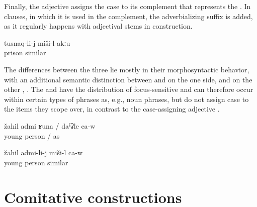 Finally, the adjective   assigns the  case to its complement that represents the  . In  clauses, in which it is used in the  complement, the adverbializing suffix  is added, as it regularly happens with adjectival stems in  construction.
%
\begin{exe}
	\ex	\label{ex:This is not similar to a prison}
	\gll	tusnaq-li-j	miši-l	akːu\\
		prison	similar	\\
	\glt	{}
\end{exe}

The differences between the three  lie mostly in their morphosyntactic behavior, with an additional semantic distinction between  and  on the one side, and  on the other , . The   and  have the distribution of focus-sensitive  and can therefore occur within certain types of phrases as, e.g., noun phrases, but do not assign case to the items they scope over, in contrast to the case-assigning adjective .
%
\begin{exe}
	\ex	\label{ex:‎‎‎(He) is like a young man. (i.e. He seems to be young, he looks young or behaves as if he were young)}
	\gll	žahil	admi	ʁuna	/	daˁʡle	ca-w\\
		young	person		/	as	\\
	\glt	{}

	\ex	\label{ex:‎‎‎(He) is similar to a young man}
	\gll	žahil	admi-li-j	miši-l	ca-w\\
		young	person	similar	\\
	\glt	{}
\end{exe}



\section{Comitative constructions}
\label{sec:Comitative constructions}

